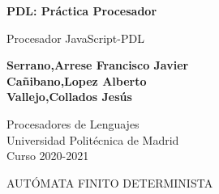 \documentclass{article}
\begin{document}
\begin{titlepage}
    \begin{center}
        \vspace*{1cm}

        \Huge
        \textbf{PDL: Práctica Procesador}
        
        \vspace{0.5cm}
        \large
        Procesador JavaScript-PDL
        
        \vspace{3cm}
       
        \textbf{
            Serrano,Arrese Francisco Javier\\
            Cañibano,Lopez Alberto\\
            Vallejo,Collados Jesús
            }
            
        \vspace{8cm}
    
        \large
        Procesadores de Lenguajes\\
        Universidad Politécnica de Madrid\\
        Curso 2020-2021
        
    \end{center}
\end{titlepage}

\begin{center}
AUTÓMATA FINITO DETERMINISTA
\end{center}

\vspace*{1cm}
\vspace*{1cm}
\end{document}
